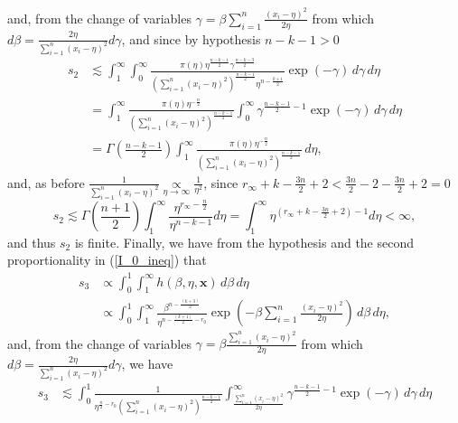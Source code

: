 \documentclass[12pt]{interact}
\theoremstyle{plain}%
\theoremstyle{definition}
\theoremstyle{remark}
\begin{document}
\begin{appendix}
\begin{equation*}
\end{equation*}
and, from the change of variables $\gamma = \beta \sum_{i=1}^{n}\frac{(x_i - \eta)^2}{2\eta}$ from which $d\beta = \frac{2\eta}{\sum_{i=1}^{n}(x_i - \eta)^2}d\gamma$, and since by hypothesis $n-k-1>0$
\begin{equation*}
\begin{aligned}
s_2 &\lesssim \int_1^\infty  
 \int_0^\infty \frac{\pi(\eta)\eta^{\frac{n-k-1}{2}}\gamma^{\frac{n-k-3}{2}}}{(\sum_{i=1}^{n}(x_i - \eta)^2)^{\frac{n-k-1}{2}}\eta^{n-\frac{k+1}{2}}} \exp\left( -\gamma\right) \, d\gamma\, d\eta
 \\
 &= \int_1^\infty 
  \frac{\pi(\eta)\eta^{-\frac{n}{2}}}{(\sum_{i=1}^{n}(x_i - \eta)^2)^{\frac{n-k-1}{2}}} \int_0^\infty \gamma^{\frac{n-k-1}{2}-1}\exp\left( -\gamma\right) \, d\gamma\, d\eta
  \\ &= \Gamma\left(\frac{n-k-1}{2}\right)\int_1^\infty 
  \frac{\pi(\eta)\eta^{-\frac{n}{2}}}{(\sum_{i=1}^{n}(x_i - \eta)^2)^{\frac{n-k-1}{2}}}\, d\eta,
\end{aligned}
\end{equation*}
and, as before $\frac{1}{\sum_{i=1}^n (x_i-\eta)^2}\underset{\eta\to \infty} {\propto }\frac{1}{\eta^2}$, since $r_\infty+k-\frac{3n}{2}+2<\frac{3n}{2}-2 - \frac{3n}{2}+2 = 0$
\begin{equation*} s_2 \lesssim \Gamma\left(\frac{n+1}{2}\right) \int_1^\infty \frac{\eta^{r_\infty-\frac{n}{2}}}{\eta^{n-k-1}} d\eta = \int_1^\infty \eta^{(r_\infty+k-\frac{3n}{2}+2)-1} d\eta <\infty,
\end{equation*}
and thus $s_2$ is finite. Finally, we have from the hypothesis and the second proportionality in (\ref{I_0_ineq}) that
\begin{equation*}
\begin{aligned}
s_3 &\propto \int_0^1  
 \int_1^\infty h(\beta,\eta,\boldsymbol{x}) \, d\beta\, d\eta \\
  &\propto \int_0^1  
\int_1^\infty \frac{\beta^{n-\frac{(k+3)}{2}}}{\eta^{n-\frac{(k+1)}{2}-r_0}} \exp\left( -\beta\sum_{i=1}^{n}\frac{(x_i - \eta)^2}{2\eta} \right)\, d\beta\, d\eta,
 \end{aligned}
\end{equation*}
and, from the change of variables $\gamma = \beta \frac{\sum_{i=1}^{n}(x_i - \eta)^2}{2\eta}$ from which $d\beta = \frac{2\eta}{\sum_{i=1}^{n}(x_i - \eta)^2}d\gamma$, we have
\begin{equation*}
\begin{aligned}
s_3 &\lesssim \int_0^1 
  \frac{1}{\eta^{\frac{n}{2}-r_0}(\sum_{i=1}^{n}(x_i - \eta)^2)^{\frac{n-k-1}{2}}}\int_{\frac{\sum_{i=1}^{n}(x_i - \eta)^2}{2\eta}}^\infty \gamma^{\frac{n-k-1}{2}-1}\exp\left( -\gamma\right) \, d\gamma\, d\eta

\end{aligned}
\end{equation*}
\end{appendix}
\end{document}
